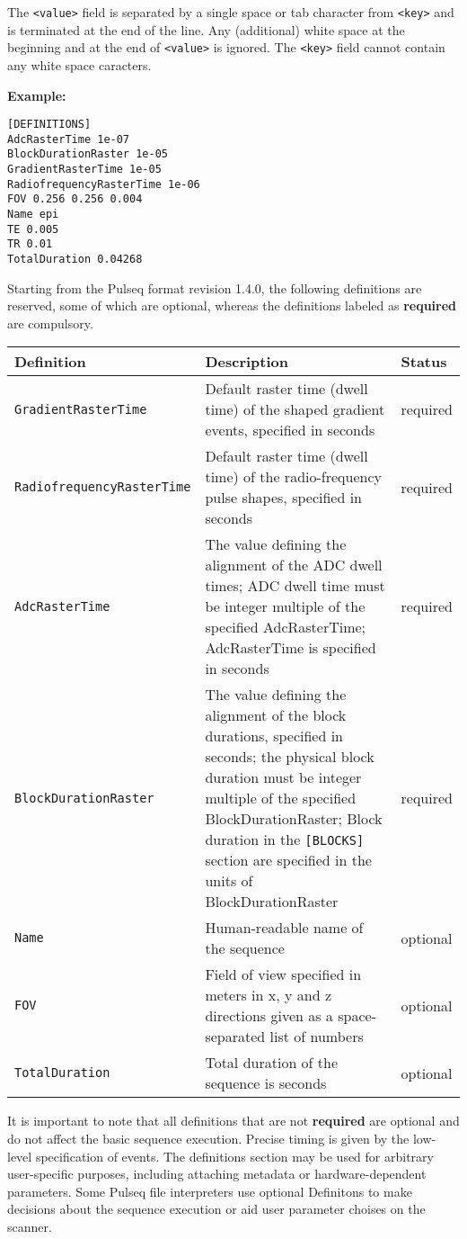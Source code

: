 \documentclass{article}
\begin{document}
The \verb.<value>. field is separated by a single space or tab character from \verb.<key>. and is terminated at the end of the line. Any (additional) white space at the beginning and at the end of \verb.<value>. is ignored. The \verb.<key>. field cannot contain any white space caracters.

\textbf{Example:}
\begin{lstlisting}
[DEFINITIONS]
AdcRasterTime 1e-07 
BlockDurationRaster 1e-05 
GradientRasterTime 1e-05 
RadiofrequencyRasterTime 1e-06 
FOV 0.256 0.256 0.004 
Name epi 
TE 0.005
TR 0.01
TotalDuration 0.04268 
\end{lstlisting}

Starting from the Pulseq format revision 1.4.0, the following definitions are reserved, some of which are optional, whereas the definitions labeled as \textbf{required} are compulsory.

\begin{tabularx}{\textwidth}{lXl}
\toprule
Definition & Description & Status\\
\midrule
\verb.GradientRasterTime. & Default raster time (dwell time) of the shaped gradient events, specified in seconds & required \\
\verb.RadiofrequencyRasterTime. & Default raster time (dwell time) of the radio-frequency pulse shapes, specified in seconds & required \\
\verb.AdcRasterTime. & The value defining the alignment of the ADC dwell times; ADC dwell time must be integer multiple of the specified AdcRasterTime; AdcRasterTime is specified in seconds & required \\
\verb.BlockDurationRaster. & The value defining the alignment of the block durations, specified in seconds; the physical block duration must be integer multiple of the specified BlockDurationRaster; Block duration in the \verb.[BLOCKS]. section are specified in the units of BlockDurationRaster  & required\\
\verb.Name. & Human-readable name of the sequence & optional \\
\verb.FOV. & Field of view specified in meters in x, y and z directions given as a space-separated list of numbers & optional\\
\verb.TotalDuration. & Total duration of the sequence is seconds & optional\\
\bottomrule
\end{tabularx}

It is important to note that all definitions that are not  \textbf{required} are optional and do not affect the basic sequence execution. Precise timing is given by the low-level specification of events. The definitions section may be used for arbitrary user-specific purposes, including attaching metadata or hardware-dependent parameters. Some Pulseq file interpreters use optional Definitons to make decisions about the sequence execution or aid user parameter choises on the scanner.
\end{document}
